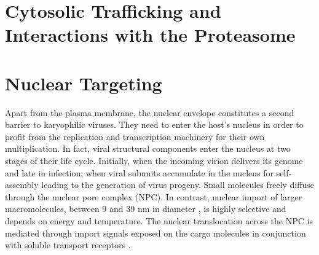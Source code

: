 
    






\section{Cytosolic Trafficking and Interactions with the Proteasome}

\section{Nuclear Targeting}
\label{Localization}      
Apart from the plasma membrane, the nuclear envelope constitutes a second barrier to karyophilic viruses. They need to enter the host's nucleus in order to profit from the replication and transcription machinery for their own multiplication. In fact, viral structural components enter the nucleus at two stages of their life cycle. Initially, when the incoming virion delivers its genome and late in infection, when viral subunits accumulate in the nucleus for self-assembly leading to the generation of virus progeny. Small molecules freely diffuse through the nuclear pore complex (NPC). In contrast, nuclear import of larger macromolecules, between 9 and 39 nm in diameter \cite{pmid11854401}, is highly selective and depends on energy and temperature. The nuclear translocation across the NPC is mediated through import signals exposed on the cargo molecules in conjunction with soluble transport receptors \cite{pmid14570049, pmid14504656, pmid15702987}. 

